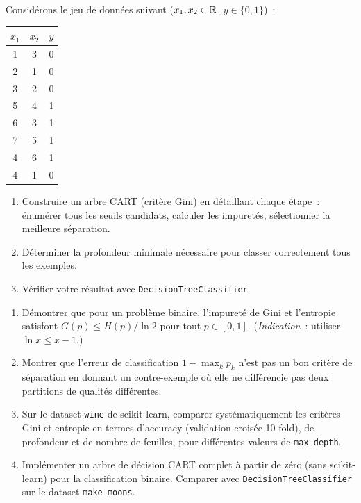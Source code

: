 \begin{exercice}
Consid\'erons le jeu de donn\'ees suivant ($x_1, x_2 \in \mathbb{R}$, $y \in
\{0, 1\}$)~:
\begin{center}
\begin{tabular}{ccc}
\toprule
$x_1$ & $x_2$ & $y$ \\
\midrule
1 & 3 & 0 \\
2 & 1 & 0 \\
3 & 2 & 0 \\
5 & 4 & 1 \\
6 & 3 & 1 \\
7 & 5 & 1 \\
4 & 6 & 1 \\
4 & 1 & 0 \\
\bottomrule
\end{tabular}
\end{center}
\begin{enumerate}
  \item Construire un arbre CART (crit\`ere Gini) en d\'etaillant chaque
    \'etape~: \'enum\'erer tous les seuils candidats, calculer les impuret\'es,
    s\'electionner la meilleure s\'eparation.
  \item D\'eterminer la profondeur minimale n\'ecessaire pour classer
    correctement tous les exemples.
  \item V\'erifier votre r\'esultat avec \texttt{DecisionTreeClassifier}.
\end{enumerate}
\end{exercice}

\begin{exercice}
\begin{enumerate}
  \item D\'emontrer que pour un probl\`eme binaire, l'impuret\'e de Gini et
    l'entropie satisfont $G(p) \leq H(p) / \ln 2$ pour tout $p \in [0, 1]$.
    (\emph{Indication}~: utiliser $\ln x \leq x - 1$.)
  \item Montrer que l'erreur de classification $1 - \max_k p_k$ n'est pas un
    bon crit\`ere de s\'eparation en donnant un contre-exemple o\`u elle ne
    diff\'erencie pas deux partitions de qualit\'es diff\'erentes.
  \item Sur le dataset \texttt{wine} de scikit-learn, comparer
    syst\'ematiquement les crit\`eres Gini et entropie en termes d'accuracy
    (validation crois\'ee 10-fold), de profondeur et de nombre de feuilles,
    pour diff\'erentes valeurs de \texttt{max\_depth}.
  \item Impl\'ementer un arbre de d\'ecision CART complet \`a partir de z\'ero
    (sans scikit-learn) pour la classification binaire. Comparer avec
    \texttt{DecisionTreeClassifier} sur le dataset \texttt{make\_moons}.
\end{enumerate}
\end{exercice}
